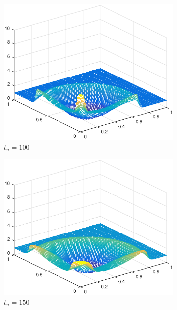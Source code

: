 \begin{figure}[h!]
    \begin{subfigure}[t]{0.48\textwidth}
        \centering
        \includegraphics[width=\textwidth]{images/sol_ri_0100.eps}
        \caption{$t_{n}=100$}
        \label{fig:50}
    \end{subfigure}
    \begin{subfigure}[t]{0.48\textwidth}
        \centering
        \includegraphics[width=\textwidth]{images/sol_ri_0150.eps}
        \caption{$t_{n}=150$}
        \label{fig:100}
    \end{subfigure}
    \begin{subfigure}[t]{0.48\textwidth}

\end{subfigure}
\end{figure}

